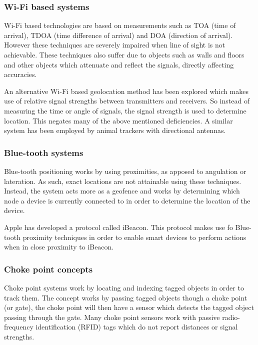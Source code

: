 \documentclass[11pt,a4paper]{article}
\begin{document}
	\subsubsection{Wi-Fi based systems}
		Wi-Fi based technologies are based on measurements such as TOA (time of arrival), TDOA (time difference of arrival) and DOA (direction of arrival). However these techniques are severely impaired when line of sight is not achievable. These techniques also suffer due to objects such as walls and floors and other objects which attenuate and reflect the signals, directly affecting accuracies.
	
		An alternative Wi-Fi based geolocation method has been explored which makes use of relative signal strengths between transmitters and receivers. So instead of measuring the time or angle of signals, the signal strength is used to determine location. This negates many of the above mentioned deficiencies. A similar system has been employed by animal trackers with directional antennas.
		\cite{yongguang_chen_signal_2002}
	
	\subsubsection{Blue-tooth systems}
		Blue-tooth positioning works by using proximities, as apposed to angulation or lateration. As such, exact locations are not attainable using these techniques. Instead, the system acts more as a geofence and works by determining which node a device is currently connected to in order to determine the location of the device.
	
		Apple has developed a protocol called iBeacon. This protocol makes use fo Blue-tooth proximity techniques in order to enable smart devices to perform actions when in close proximity to iBeacon.
		\cite{_everything_????}
	
	\subsubsection{Choke point concepts}
		Choke point systems work by locating and indexing tagged objects in order to track them. The concept works by passing tagged objects though a choke point (or gate), the choke point will then have a sensor which detects the tagged object passing through the gate. Many choke point sensors work with passive radio-frequency identification (RFID) tags which do not report distances or signal strengths.
		\cite{reza_investigation_2008}
	
\end{document}
